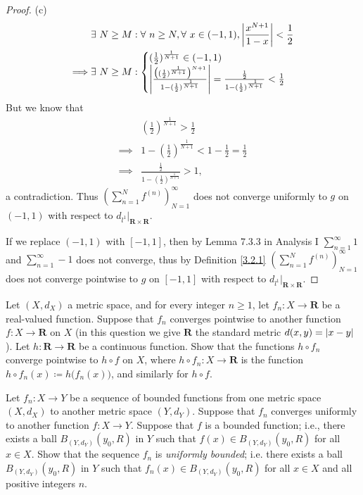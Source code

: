 \begin{proof}{(c)}
\begin{align*}
                 & \exists\ N \geq M : \forall\ n \geq N, \forall\ x \in (-1, 1), \abs*{\frac{x^{N + 1}}{1 - x}} < \frac{1}{2} \\
        \implies & \exists\ N \geq M : \begin{cases}
            (\frac{1}{2})^{\frac{1}{N + 1}} \in (-1, 1) \\
            \abs*{\frac{\big((\frac{1}{2})^{\frac{1}{N + 1}}\big)^{N + 1}}{1 - (\frac{1}{2})^{\frac{1}{N + 1}}}} = \frac{\frac{1}{2}}{1 - (\frac{1}{2})^{\frac{1}{N + 1}}} < \frac{1}{2}
        \end{cases}
    \end{align*}
    But we know that
    \begin{align*}
                 & (\frac{1}{2})^{\frac{1}{N + 1}} > \frac{1}{2}                       \\
        \implies & 1 - (\frac{1}{2})^{\frac{1}{N + 1}} < 1 - \frac{1}{2} = \frac{1}{2} \\
        \implies & \frac{\frac{1}{2}}{1 - (\frac{1}{2})^{\frac{1}{N + 1}}} > 1,
    \end{align*}
    a contradiction.
    Thus \((\sum_{n = 1}^N f^{(n)})_{N = 1}^\infty\) does not converge uniformly to \(g\) on \((-1, 1)\) with respect to \(d_{l^1}|_{\mathbf{R} \times \mathbf{R}}\).

    If we replace \((-1, 1)\) with \([-1, 1]\), then by Lemma 7.3.3 in Analysis I \(\sum_{n = 1}^\infty 1\) and \(\sum_{n = 1}^\infty -1\) does not converge, thus by Definition \ref{3.2.1} \((\sum_{n = 1}^N f^{(n)})_{N = 1}^\infty\) does not converge pointwise to \(g\) on \([-1, 1]\) with respect to \(d_{l^1}|_{\mathbf{R} \times \mathbf{R}}\).
\end{proof}

\begin{exercise}\label{ex 3.2.3}
    Let \((X, d_X)\) a metric space, and for every integer \(n \geq 1\), let \(f_n : X \to \mathbf{R}\) be a real-valued function.
    Suppose that \(f_n\) converges pointwise to another function \(f : X \to \mathbf{R}\) on \(X\)
    (in this question we give \(\mathbf{R}\) the standard metric \(d(x, y) = \abs*{x - y}\)).
    Let \(h : \mathbf{R} \to \mathbf{R}\) be a continuous function.
    Show that the functions \(h \circ f_n\) converge pointwise to \(h \circ f\) on \(X\), where \(h \circ f_n : X \to \mathbf{R}\) is the function \(h \circ f_n(x) \coloneqq h\big(f_n(x)\big)\), and similarly for \(h \circ f\).
\end{exercise}

\begin{exercise}\label{ex 3.2.4}
    Let \(f_n : X \to Y\) be a sequence of bounded functions from one metric space \((X, d_X)\) to another metric space \((Y, d_Y)\).
    Suppose that \(f_n\) converges uniformly to another function \(f : X \to Y\).
    Suppose that \(f\) is a bounded function;
    i.e., there exists a ball \(B_{(Y, d_Y)}(y_0, R)\) in \(Y\) such that \(f(x) \in B_{(Y, d_Y)}(y_0, R)\) for all \(x \in X\).
    Show that the sequence \(f_n\) is \emph{uniformly bounded};
    i.e. there exists a ball \(B_{(Y, d_Y)}(y_0, R)\) in \(Y\) such that \(f_n(x) \in B_{(Y, d_Y)}(y_0, R)\) for all \(x \in X\) and all positive integers \(n\).
\end{exercise}